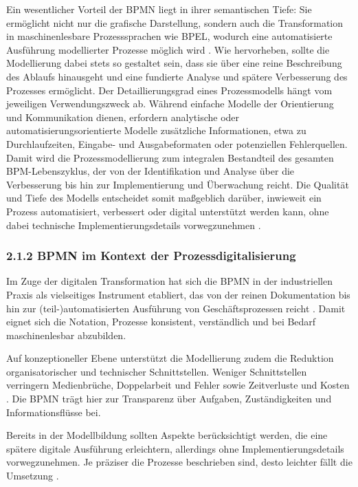 \documentclass[a4paper,12pt]{scrreprt}
\begin{document}
Ein wesentlicher Vorteil der \ac{BPMN} liegt in ihrer semantischen Tiefe: 
Sie ermöglicht nicht nur die grafische Darstellung, sondern auch die Transformation in 
maschinenlesbare Prozesssprachen wie \ac{BPEL}, wodurch eine automatisierte Ausführung 
modellierter Prozesse möglich wird \citep[vgl.][S.~2--4]{mazanek2011}. 
Wie \citet[S.~22--27]{ElstermannEtAl2023} hervorheben, sollte die Modellierung dabei stets 
so gestaltet sein, dass sie über eine reine Beschreibung des Ablaufs hinausgeht und eine 
fundierte Analyse und spätere Verbesserung des Prozesses ermöglicht. 
Der Detaillierungsgrad eines Prozessmodells hängt vom jeweiligen Verwendungszweck ab. 
Während einfache Modelle der Orientierung und Kommunikation dienen, erfordern 
analytische oder automatisierungsorientierte Modelle zusätzliche Informationen, 
etwa zu Durchlaufzeiten, Eingabe- und Ausgabeformaten oder potenziellen Fehlerquellen. 
Damit wird die Prozessmodellierung zum integralen Bestandteil des gesamten 
BPM-Lebenszyklus, der von der Identifikation und Analyse über die Verbesserung 
bis hin zur Implementierung und Überwachung reicht. 
Die Qualität und Tiefe des Modells entscheidet somit maßgeblich darüber, 
inwieweit ein Prozess automatisiert, verbessert oder digital unterstützt werden kann, 
ohne dabei technische Implementierungsdetails vorwegzunehmen 
\citep[vgl.][S.~22--27]{ElstermannEtAl2023}.


\subsubsection*{2.1.2 BPMN im Kontext der Prozessdigitalisierung}

Im Zuge der digitalen Transformation hat sich die \ac{BPMN} in der industriellen Praxis als vielseitiges Instrument etabliert, das von der reinen Dokumentation bis hin zur (teil-)automatisierten Ausführung von Geschäftsprozessen reicht \citep[vgl.][Kap.~3.5.8]{ElstermannEtAl2023}. 
Damit eignet sich die Notation, Prozesse konsistent, verständlich und bei Bedarf maschinenlesbar abzubilden.

Auf konzeptioneller Ebene unterstützt die Modellierung zudem die Reduktion organisatorischer und technischer Schnittstellen. Weniger Schnittstellen verringern Medienbrüche, Doppelarbeit und Fehler sowie Zeitverluste und Kosten \citep[vgl.][S.~226]{ElstermannEtAl2023}. 
Die \ac{BPMN} trägt hier zur Transparenz über Aufgaben, Zuständigkeiten und Informationsflüsse bei.

Bereits in der Modellbildung sollten Aspekte berücksichtigt werden, die eine spätere digitale Ausführung erleichtern, allerdings ohne Implementierungsdetails vorwegzunehmen. Je präziser die Prozesse beschrieben sind, desto leichter fällt die Umsetzung \citep[vgl.][S.~10]{ElstermannEtAl2023}.
\end{document}
